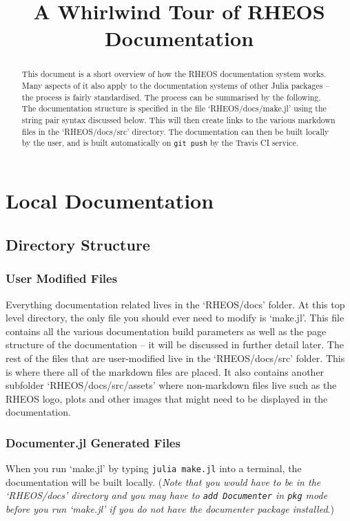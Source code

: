 \documentclass[]{article}
\title{A Whirlwind Tour of RHEOS Documentation}
\author{}
\newcommand{\cod}[1]{\colorbox{light-gray}{\texttt{#1}}}
\begin{document}
	
\date{}
\maketitle

\begin{abstract}
This document is a short overview of how the RHEOS documentation system works. Many aspects of it also apply to the documentation systems of other Julia packages -- the process is fairly standardised. The process can be summarised by the following. The documentation structure is specified in the file `RHEOS/docs/make.jl' using the string pair syntax discussed below. This will then create links to the various markdown files in the `RHEOS/docs/src' directory. The documentation can then be built locally by the user, and is built automatically on \cod{git push} by the Travis CI service.
\end{abstract}

\section{Local Documentation}
\subsection{Directory Structure}
\subsubsection{User Modified Files}
Everything documentation related lives in the `RHEOS/docs' folder. At this top level directory, the only file you should ever need to modify is `make.jl'. This file contains all the various documentation build parameters as well as the page structure of the documentation -- it will be discussed in further detail later. The rest of the files that are user-modified live in the `RHEOS/docs/src' folder. This is where there all of the markdown files are placed. It also contains another subfolder `RHEOS/docs/src/assets' where non-markdown files live such as the RHEOS logo, plots and other images that might need to be displayed in the documentation.
\subsubsection{Documenter.jl Generated Files}
When you run `make.jl' by typing \cod{julia make.jl} into a terminal, the documentation will be built locally. (\textit{Note that you would have to be in the `RHEOS/docs' directory and you may have to \cod{add Documenter} in \cod{pkg} mode before you run `make.jl' if you do not have the documenter package installed}.)\\
\end{document}
